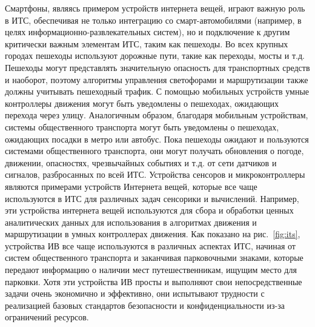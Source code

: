 Смартфоны, являясь примером устройств интернета вещей, играют важную роль в ИТС, обеспечивая не только интеграцию со смарт-автомобилями (например, в целях информационно-развлекательных систем), но и подключение к другим критически важным элементам ИТС, таким как пешеходы. Во всех крупных городах пешеходы используют дорожные пути, такие как переходы, мосты и т.д. Пешеходы могут представлять значительную опасность для транспортных средств и наоборот, поэтому алгоритмы управления светофорами и маршрутизации также должны учитывать пешеходный трафик. С помощью мобильных устройств умные контроллеры движения могут быть уведомлены о пешеходах, ожидающих перехода через улицу. Аналогичным образом, благодаря мобильным устройствам, системы общественного транспорта могут быть уведомлены о пешеходах, ожидающих посадки в метро или автобус. Пока пешеходы ожидают и пользуются системами общественного транспорта, они могут получать обновления о погоде, движении, опасностях, чрезвычайных событиях и т.д. от сети датчиков и сигналов, разбросанных по всей ИТС. Устройства сенсоров и микроконтроллеры являются примерами устройств Интернета вещей, которые все чаще используются в ИТС для различных задач сенсорики и вычислений. Например, эти устройства интернета вещей используются для сбора и обработки ценных аналитических данных для использования в алгоритмах движения и маршрутизации в умных контроллерах движения. Как показано на рис.~\ref{fig:its}, устройства ИВ все чаще используются в различных аспектах ИТС, начиная от систем общественного транспорта и заканчивая парковочными знаками, которые передают информацию о наличии мест путешественникам, ищущим место для парковки. Хотя эти устройства ИВ просты и выполняют свои непосредственные задачи очень экономично и эффективно, они испытывают трудности с реализацией базовых стандартов безопасности и конфиденциальности из-за ограничений ресурсов.

\newpage